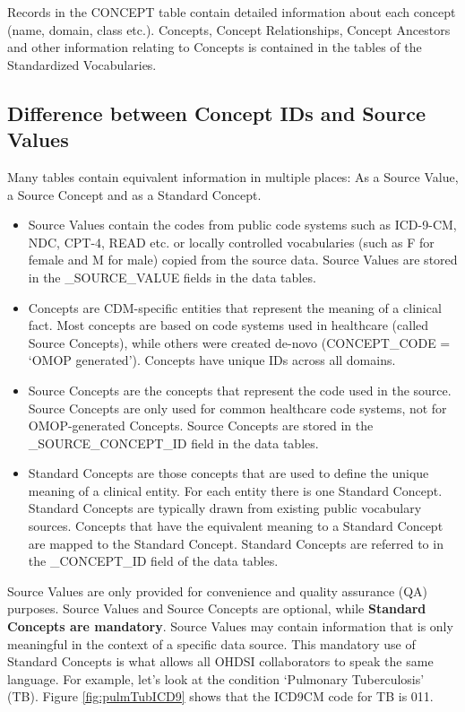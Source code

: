 \documentclass[]{book}
\providecommand{\tightlist}{%
  \setlength{\itemsep}{0pt}\setlength{\parskip}{0pt}}
\begin{document}
Records in the CONCEPT table contain detailed information about each
concept (name, domain, class etc.). Concepts, Concept Relationships,
Concept Ancestors and other information relating to Concepts is
contained in the tables of the Standardized Vocabularies.

\subsection{Difference between Concept IDs and Source
Values}\label{difference-between-concept-ids-and-source-values}

Many tables contain equivalent information in multiple places: As a
Source Value, a Source Concept and as a Standard Concept.

\begin{itemize}
\tightlist
\item
  Source Values contain the codes from public code systems such as
  ICD-9-CM, NDC, CPT-4, READ etc. or locally controlled vocabularies
  (such as F for female and M for male) copied from the source data.
  Source Values are stored in the \_SOURCE\_VALUE fields in the data
  tables.
\item
  Concepts are CDM-specific entities that represent the meaning of a
  clinical fact. Most concepts are based on code systems used in
  healthcare (called Source Concepts), while others were created de-novo
  (CONCEPT\_CODE = `OMOP generated'). Concepts have unique IDs across
  all domains.
\item
  Source Concepts are the concepts that represent the code used in the
  source. Source Concepts are only used for common healthcare code
  systems, not for OMOP-generated Concepts. Source Concepts are stored
  in the \_SOURCE\_CONCEPT\_ID field in the data tables.
\item
  Standard Concepts are those concepts that are used to define the
  unique meaning of a clinical entity. For each entity there is one
  Standard Concept. Standard Concepts are typically drawn from existing
  public vocabulary sources. Concepts that have the equivalent meaning
  to a Standard Concept are mapped to the Standard Concept. Standard
  Concepts are referred to in the \_CONCEPT\_ID field of the data
  tables.
\end{itemize}

Source Values are only provided for convenience and quality assurance
(QA) purposes. Source Values and Source Concepts are optional, while
\textbf{Standard Concepts are mandatory}. Source Values may contain
information that is only meaningful in the context of a specific data
source. This mandatory use of Standard Concepts is what allows all OHDSI
collaborators to speak the same language. For example, let's look at the
condition `Pulmonary Tuberculosis' (TB). Figure \ref{fig:pulmTubICD9}
shows that the ICD9CM code for TB is 011.
\end{document}
